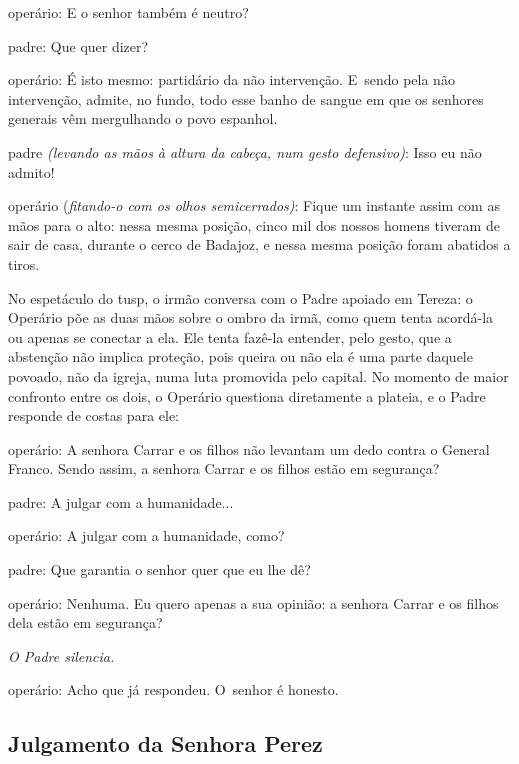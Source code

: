 \startblockquote
{\sc operário}: E o senhor também é neutro?

{\sc padre}: Que quer dizer?

{\sc operário}: É isto mesmo: partidário da não intervenção. E~sendo pela
não intervenção, admite, no fundo, todo esse banho de sangue em que os
senhores generais vêm mergulhando o povo espanhol.

{\sc padre} {\it (levando as mãos à altura da cabeça, num gesto defensivo)}:
Isso eu não admito!

{\sc operário} ({\it fitando-o com os olhos semicerrados)}: Fique um instante
assim com as mãos para o alto: nessa mesma posição, cinco mil dos nossos
homens tiveram de sair de casa, durante o cerco de Badajoz, e nessa
mesma posição foram abatidos a tiros.
\stopblockquote

No espetáculo do {\sc tusp}, o irmão conversa com o Padre apoiado em Tereza: o
Operário põe as duas mãos sobre o ombro da irmã, como quem tenta
acordá-la ou apenas se conectar a ela. Ele tenta fazê-la entender, pelo
gesto, que a abstenção não implica proteção, pois queira ou não ela é
uma parte daquele povoado, não da igreja, numa luta promovida pelo
capital. No momento de maior confronto entre os dois, o Operário
questiona diretamente a plateia, e o Padre responde de costas para ele:

\startblockquote
{\sc operário}: A senhora Carrar e os filhos não levantam um dedo contra o
General Franco. Sendo assim, a senhora Carrar e os filhos estão em
segurança?

{\sc padre}: A julgar com a humanidade...

{\sc operário}: A julgar com a humanidade, como?

{\sc padre}: Que garantia o senhor quer que eu lhe dê?

{\sc operário}: Nenhuma. Eu quero apenas a sua opinião: a senhora Carrar e os
filhos dela estão em segurança?

{\it O Padre silencia.}

{\sc operário}: Acho que já respondeu. O~senhor é honesto.
\stopblockquote


\subsection{Julgamento da Senhora Perez}

